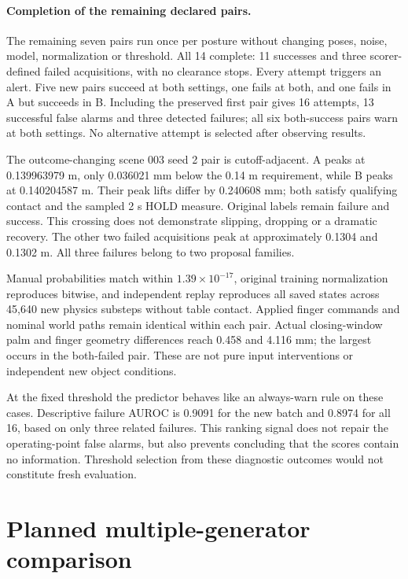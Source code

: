 \documentclass[10pt,letterpaper]{article}
\begin{document}
\paragraph{Completion of the remaining declared pairs.}
The remaining seven pairs run once per posture without changing poses, noise,
model, normalization or threshold. All 14 complete: 11 successes and three
scorer-defined failed acquisitions, with no clearance stops. Every attempt
triggers an alert. Five new pairs succeed at both settings, one fails at both,
and one fails in A but succeeds in B. Including the preserved first pair gives
16 attempts, 13 successful false alarms and three detected failures; all six
both-success pairs warn at both settings. No alternative attempt is selected
after observing results.

The outcome-changing scene 003 seed 2 pair is cutoff-adjacent. A peaks at
0.139963979 m, only 0.036021 mm below the 0.14 m requirement, while B peaks at
0.140204587 m. Their peak lifts differ by 0.240608 mm; both satisfy qualifying
contact and the sampled 2 s HOLD measure. Original labels remain failure and
success. This crossing does not demonstrate slipping, dropping or a dramatic
recovery. The other two failed acquisitions peak at approximately 0.1304 and
0.1302 m. All three failures belong to two proposal families.

Manual probabilities match within $1.39\times10^{-17}$, original training
normalization reproduces bitwise, and independent replay reproduces all saved
states across 45,640 new physics substeps without table contact. Applied finger
commands and nominal world paths remain identical within each pair. Actual
closing-window palm and finger geometry differences reach 0.458 and 4.116 mm;
the largest occurs in the both-failed pair. These are not pure input
interventions or independent new object conditions.

At the fixed threshold the predictor behaves like an always-warn rule on these
cases. Descriptive failure AUROC is 0.9091 for the new batch and 0.8974 for all
16, based on only three related failures. This ranking signal does not repair
the operating-point false alarms, but also prevents concluding that the scores
contain no information. Threshold selection from these diagnostic outcomes
would not constitute fresh evaluation.

\section{Planned multiple-generator comparison}
\end{document}
